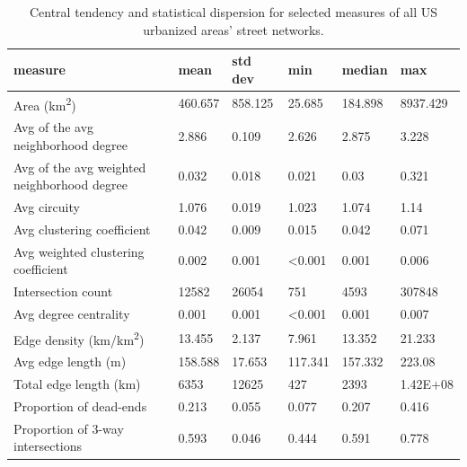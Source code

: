 \documentclass[Afour,sageh,times]{sagej}
\begin{document}
\begin{table}
\centering
\caption{Central tendency and statistical dispersion for selected measures of all US urbanized areas' street networks.}
\label{table01}
\begin{tabular}{llllll}
	\toprule
	measure                                     & mean           & std dev        & min            & median         & max            \\
	\midrule
	Area (km\textsuperscript{2})                                  & 460.657        & 858.125        & 25.685         & 184.898        & 8937.429       \\
	Avg of the avg neighborhood degree          & 2.886          & 0.109          & 2.626          & 2.875          & 3.228          \\
	Avg of the avg weighted neighborhood degree & 0.032          & 0.018          & 0.021          & 0.03           & 0.321          \\
	Avg circuity                                & 1.076          & 0.019          & 1.023          & 1.074          & 1.14           \\
	Avg clustering coefficient                  & 0.042          & 0.009          & 0.015          & 0.042          & 0.071          \\
	Avg weighted clustering coefficient         & 0.002          & 0.001          & \textless0.001 & 0.001          & 0.006          \\
	Intersection count                          & 12582          & 26054          & 751            & 4593           & 307848         \\
	Avg degree centrality                       & 0.001          & 0.001          & \textless0.001 & 0.001          & 0.007          \\
	Edge density (km/km\textsuperscript{2})                       & 13.455         & 2.137          & 7.961          & 13.352         & 21.233         \\
	Avg edge length (m)                         & 158.588        & 17.653         & 117.341        & 157.332        & 223.08         \\
	Total edge length (km)                      & 6353           & 12625          & 427            & 2393           & 1.42E+08       \\
	Proportion of dead-ends                     & 0.213          & 0.055          & 0.077          & 0.207          & 0.416          \\
	Proportion of 3-way intersections           & 0.593          & 0.046          & 0.444          & 0.591          & 0.778          \\

\end{tabular}
\end{table}
\end{document}

